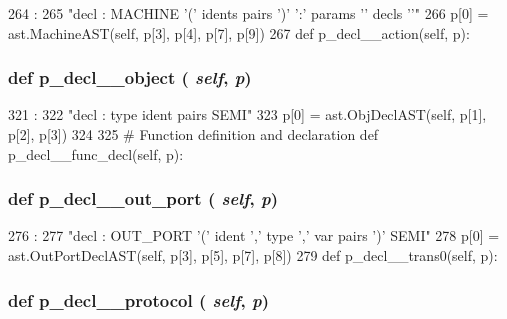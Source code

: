 \begin{DoxyCode}
264                                  :
265         "decl : MACHINE '(' idents pairs ')' ':' params '{' decls '}'"
266         p[0] = ast.MachineAST(self, p[3], p[4], p[7], p[9])
267 
    def p_decl__action(self, p):
\end{DoxyCode}
\hypertarget{classslicc_1_1parser_1_1SLICC_ac5d6e1167568798c10875717aa01f18b}{
\subsubsection[{p\_\-decl\_\-\_\-object}]{\setlength{\rightskip}{0pt plus 5cm}def p\_\-decl\_\-\_\-object ( {\em self}, \/   {\em p})}}
\label{classslicc_1_1parser_1_1SLICC_ac5d6e1167568798c10875717aa01f18b}



\begin{DoxyCode}
321                                :
322         "decl : type ident pairs SEMI"
323         p[0] = ast.ObjDeclAST(self, p[1], p[2], p[3])
324 
325     # Function definition and declaration
    def p_decl__func_decl(self, p):
\end{DoxyCode}
\hypertarget{classslicc_1_1parser_1_1SLICC_a5fd0ceea4e6b8fad60c5c4e689a0211e}{
\subsubsection[{p\_\-decl\_\-\_\-out\_\-port}]{\setlength{\rightskip}{0pt plus 5cm}def p\_\-decl\_\-\_\-out\_\-port ( {\em self}, \/   {\em p})}}
\label{classslicc_1_1parser_1_1SLICC_a5fd0ceea4e6b8fad60c5c4e689a0211e}



\begin{DoxyCode}
276                                  :
277         "decl : OUT_PORT '(' ident ',' type ',' var pairs ')' SEMI"
278         p[0] = ast.OutPortDeclAST(self, p[3], p[5], p[7], p[8])
279 
    def p_decl__trans0(self, p):
\end{DoxyCode}
\hypertarget{classslicc_1_1parser_1_1SLICC_a4f068603e33d621eb4962ce2f69174f0}{
\subsubsection[{p\_\-decl\_\-\_\-protocol}]{\setlength{\rightskip}{0pt plus 5cm}def p\_\-decl\_\-\_\-protocol ( {\em self}, \/   {\em p})}}
\label{classslicc_1_1parser_1_1SLICC_a4f068603e33d621eb4962ce2f69174f0}



